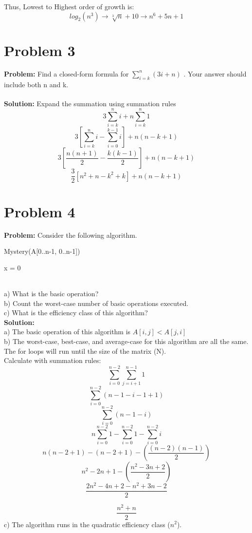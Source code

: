 \documentclass{article}
\begin{document}
Thus, Lowest to Highest order of growth is: \[log_2(n^3) \to \sqrt[3]{n} + 10 \to n^6 +5n +1\]

\section{Problem 3}
\textbf{Problem: }
Find a closed-form formula for $\sum_{i=k}^{n} (3i+n)$ . Your answer should include both n and k. \\
\\
\textbf{Solution: }
Expand the summation using summation rules
\[3 \sum_{i=k}^{n} i + n \sum_{i=k}^{n} 1 \]
\[3[\sum_{i=k}^{n}i - \sum_{i=0}^{k-1}i ] + n(n-k+1) \]
\[3[\frac{n(n+1)}{2} - \frac{k(k-1)}{2}] + n(n-k+1)\]
\[
\boxed
{\frac{3}{2}[n^2 + n - k^2 + k] + n(n-k+1)}
\]

\section{Problem 4}
\textbf{Problem: }
Consider the following algorithm.\\
\begin{algorithm}
\caption{Mystery(A[0..n-1, 0..n-1])}
x = 0 \\
\end{algorithm} \\
a) What is the basic operation? \\
b) Count the worst-case number of basic operations executed.\\
c) What is the efficiency class of this algorithm?\\
\textbf{Solution: }\\
a) The basic operation of this algorithm is $A[i,j] < A[j,i]$\\
b) The worst-case, best-case, and average-case for this algorithm are all the same. The for loops will run until the size of the matrix (N). \\
    Calculate with summation rules:
    \[\sum_{i=0}^{n-2} \sum_{j=i+1}^{n-1} 1\]
    \[\sum_{i=0}^{n-2} (n-1-i-1+1)\]
    \[\sum_{i=0}^{n-2} (n-1-i)\]
    \[n\sum_{i=0}^{n-2} 1 - \sum_{i=0}^{n-2} 1 - \sum_{i=0}^{n-2} i\]
    \[n(n-2+1) - (n-2+1) - (\frac{(n-2)(n-1)}{2})\]
    \[n^2 - 2n + 1 - (\frac{n^2 - 3n + 2}{2})\]
    \[\frac{2n^2 - 4n + 2 - n^2 + 3n - 2}{2}\]
    
    \[
    \boxed
    {\frac{n^2 + n}{2}}
    \]
c) The algorithm runs in the quadratic efficiency class ($n^2$).\\
\end{document}
